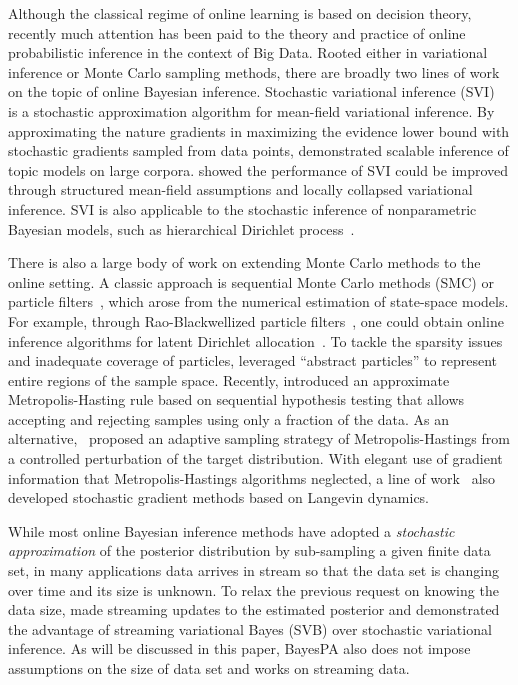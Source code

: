 \documentclass[twoside,11pt]{article}
\begin{document}
Although the classical regime of online learning is based on decision theory, recently much attention has been paid to the theory and practice of online probabilistic inference in the context of Big Data. Rooted either in variational inference or Monte Carlo sampling methods, there are broadly two lines of work on the topic of online Bayesian inference. Stochastic variational inference (SVI)~\citep{hoffman2013stochastic} is a stochastic approximation algorithm for mean-field variational inference. By approximating the nature gradients in maximizing the evidence lower bound with stochastic gradients sampled from data points, \cite{hoffman2013stochastic} demonstrated scalable inference of topic models on large corpora. \cite{mimno2012sparse} showed the performance of SVI could be improved through structured mean-field assumptions and locally collapsed variational inference. SVI is also applicable to the stochastic inference of nonparametric Bayesian models, such as hierarchical Dirichlet process~\citep{wang2011onlinealgo, wang2012truncation}.

There is also a large body of work on extending Monte Carlo methods to the online setting. A classic approach is sequential Monte Carlo methods (SMC) or particle filters~\citep{doucet2009tutorial}, which arose from the numerical estimation of state-space models. For example,  through Rao-Blackwellized particle filters~\citep{doucet2000rao}, one could obtain online inference algorithms for latent Dirichlet allocation~\citep{canini2009online}. To tackle the sparsity issues and inadequate coverage of particles, \cite{steinhardt2014filtering} leveraged ``abstract particles'' to represent entire regions of the sample space. Recently, \cite{korattikara2014austerity} introduced an approximate Metropolis-Hasting rule based on sequential hypothesis testing that allows accepting and rejecting samples using only a fraction of the data. As an alternative,~\cite{bardenet2014towards} proposed an adaptive sampling strategy of Metropolis-Hastings from a controlled perturbation of the target distribution. With elegant use of gradient information that Metropolis-Hastings algorithms neglected, a line of work~\citep{welling2011bayesian, welling2012mc, patterson2013stochastic} also developed stochastic gradient methods based on Langevin dynamics.

While most online Bayesian inference methods have adopted a \emph{stochastic approximation} of the posterior distribution by sub-sampling a given finite data set, in many applications data arrives in stream so that the data set is changing over time and its size is unknown. To relax the previous request on knowing the data size, \cite{broderick2013streaming} made streaming updates to the estimated posterior and demonstrated the advantage of streaming variational Bayes (SVB) over stochastic variational inference. As will be discussed in this paper, BayesPA also does not impose assumptions on the size of data set and works on streaming data.
\end{document}
